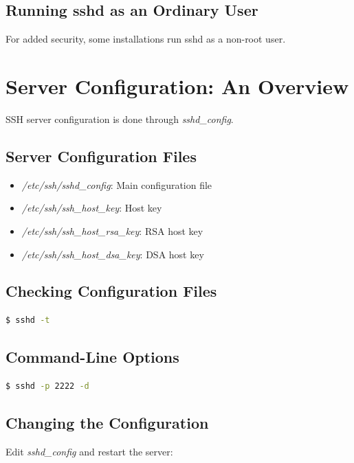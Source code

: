 \documentclass[12pt]{book}
\begin{document}
\subsection{Running sshd as an Ordinary User}

For added security, some installations run sshd as a non-root user.

\section{Server Configuration: An Overview}

SSH server configuration is done through \textit{sshd\_config}.

\subsection{Server Configuration Files}

\begin{itemize}
    \item \textit{/etc/ssh/sshd\_config}: Main configuration file
    \item \textit{/etc/ssh/ssh\_host\_key}: Host key
    \item \textit{/etc/ssh/ssh\_host\_rsa\_key}: RSA host key
    \item \textit{/etc/ssh/ssh\_host\_dsa\_key}: DSA host key
\end{itemize}

\subsection{Checking Configuration Files}

\begin{lstlisting}[language=bash]
$ sshd -t
\end{lstlisting}

\subsection{Command-Line Options}

\begin{lstlisting}[language=bash]
$ sshd -p 2222 -d
\end{lstlisting}

\subsection{Changing the Configuration}

Edit \textit{sshd\_config} and restart the server:
\end{document}

